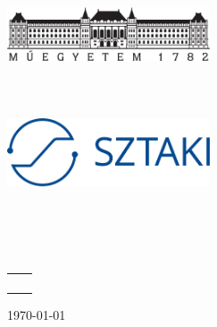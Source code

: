 \hypersetup{pageanchor=false}
\begin{titlepage}
\begin{center}
\includegraphics[width=60mm,keepaspectratio]{figures/bme_logo.pdf}\\
\textbf{\bme}\\
\textmd{\vik}\\
\textmd{\viktanszek}\\[1cm]

\includegraphics[width=60mm, keepaspectratio]{figures/sztaki_logo.png}\\
\textbf{\sztaki}\\
\textmd{\rik}\\[3cm]

{\huge \bfseries \vikcim}\\[0.8cm]
\vspace{0.5cm}
\textsc{\Large \vikdoktipus}\\[4cm]

{
	\renewcommand{\arraystretch}{0.85}
	\begin{tabular}{cc}
	 \makebox[7cm]{\emph{\keszitette}} & \makebox[7cm]{\emph{\konzulens}} \\ \noalign{\smallskip}
	 \makebox[7cm]{\szerzo} & \makebox[7cm]{\vikkonzulensA} \\
	  & \makebox[7cm]{\vikkonzulensB} \\
	  & \makebox[7cm]{\vikkonzulensC} \\
	\end{tabular}
}

\vfill
{\large \today}
\end{center}
\end{titlepage}
\hypersetup{pageanchor=false}

